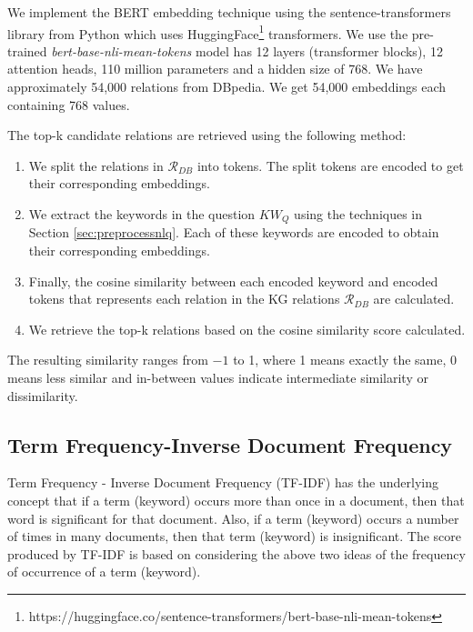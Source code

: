 We implement the BERT embedding technique using the sentence-transformers library from Python which uses HuggingFace\footnote{https://huggingface.co/sentence-transformers/bert-base-nli-mean-tokens} transformers. We use the pre-trained \textit{bert-base-nli-mean-tokens} model has 12 layers (transformer blocks), 12 attention heads, 110 million parameters and a hidden size of 768. We have approximately 54,000 relations from DBpedia. We get 54,000 embeddings each containing 768 values.

The top-k candidate relations are retrieved using the following method: 
\begin{enumerate}
    \item We split the relations in $\mathcal{R}_{DB}$ into tokens. The split tokens are encoded to get their corresponding embeddings.
    \item  We extract the keywords in the question $KW_{Q}$ using the techniques in Section \ref{sec:preprocessnlq}. Each of these keywords are encoded to obtain their corresponding embeddings.
    \item Finally, the cosine similarity between each encoded keyword and encoded tokens that represents each relation in the KG relations $\mathcal{R}_{DB}$ are calculated. 
    \item We retrieve the top-k relations based on the cosine similarity score calculated.
\end{enumerate}

The resulting similarity ranges from $-1$ to 1, where 1 means exactly the same, 0 means less similar and in-between values indicate intermediate similarity or dissimilarity.

\subsection{Term Frequency-Inverse Document Frequency}
\label{sec:tfidf}
Term Frequency - Inverse Document Frequency (TF-IDF) has the underlying concept that if a term (keyword) occurs more than once in a document, then that word is significant for that document. Also, if a term (keyword) occurs a number of times in many documents, then that term (keyword) is insignificant. The score produced by TF-IDF is based on considering the above two ideas of the frequency of occurrence of a term (keyword). 

